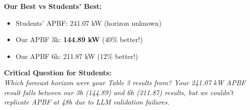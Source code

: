 \documentclass{article}
\begin{document}
\vspace{0.5cm}

\textbf{Our Best vs Students' Best:}
\begin{itemize}
\item Students' APBF: 241.07 kW (horizon unknown)
\item Our APBF 3h: \textbf{144.89 kW} (40\% better!)
\item Our APBF 6h: 211.87 kW (12\% better!)
\end{itemize}

\textbf{Critical Question for Students:}
\\
\textit{Which forecast horizon were your Table 3 results from? Your 241.07 kW APBF result falls between our 3h (144.89) and 6h (211.87) results, but we couldn't replicate APBF at 48h due to LLM validation failures.}
\end{document}
